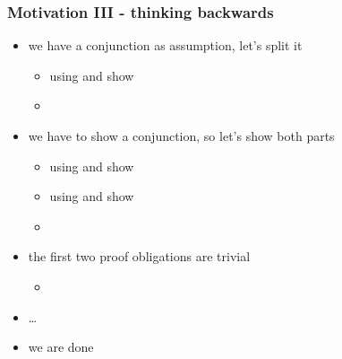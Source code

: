 \begin{frame}
\frametitle{Motivation III - thinking backwards}
\begin{itemize}
\item we have a conjunction as assumption, let's split it 
\begin{itemize}
\item using  and  show 
      \item {}
\end{itemize}
\item we have to show a conjunction, so let's show both parts
\begin{itemize}
  \item using  and  show 
  \item using  and  show 
      \item {}
\end{itemize}
\item the first two proof obligations are trivial
\begin{itemize}
      \item {}
\end{itemize}
\item \ldots
\item we are done
\end{itemize}
\end{frame}

